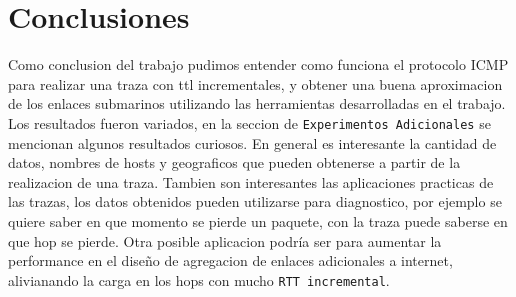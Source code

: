 \section{Conclusiones}
Como conclusion del trabajo pudimos entender como funciona el protocolo ICMP para realizar una traza con ttl incrementales, y obtener una buena aproximacion de los enlaces submarinos utilizando las herramientas desarrolladas en el trabajo. Los resultados fueron variados, en la seccion de \texttt{Experimentos Adicionales} se mencionan algunos resultados curiosos. En general es interesante la cantidad de datos, nombres de hosts y geograficos que pueden obtenerse a partir de la realizacion de una traza. Tambien son interesantes las aplicaciones practicas de las trazas, los datos obtenidos pueden utilizarse para diagnostico, por ejemplo se quiere saber en que momento se pierde un paquete, con la traza puede saberse en que hop se pierde. Otra posible aplicacion podr\'ia ser para aumentar la performance en el diseño de agregacion de enlaces adicionales a internet, alivianando la carga en los hops con mucho \texttt{RTT incremental}.